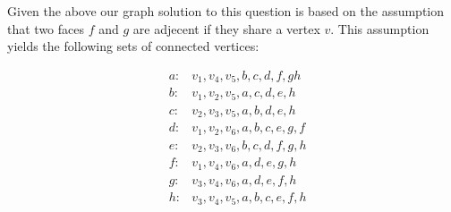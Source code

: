 Given the above our graph solution to this question is based on the assumption that two faces \(f\) and \(g\) are adjecent if they share a vertex \(v\). This assumption yields the following sets of connected vertices:

\begin{align}
  &a:& {v_1, v_4, v_5, b, c, d, f, g h}\\
  &b:& {v_1, v_2, v_5, a, c, d, e, h}\\
  &c:& {v_2, v_3, v_5, a, b, d, e, h}\\
  &d:& {v_1, v_2, v_6, a, b, c, e, g, f}\\
  &e:& {v_2, v_3, v_6, b, c, d, f, g, h}\\
  &f:& {v_1, v_4, v_6, a, d, e, g, h}\\
  &g:& {v_3, v_4, v_6, a, d, e, f, h}\\
  &h:& {v_3, v_4, v_5, a, b, c, e, f, h}
\end{align}

%
%
%
%   
%
%   
%
%
%
%
%
%
%
%
%
